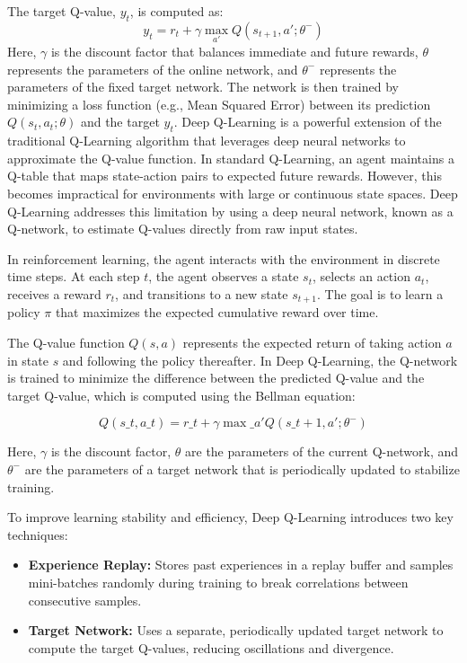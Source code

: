 \documentclass{report}
\begin{document}
The target Q-value, $y_t$, is computed as:
\begin{equation}
y_t = r_t + \gamma \max_{a'} Q(s_{t+1}, a'; \theta^-)
\end{equation}
Here, $\gamma$ is the discount factor that balances immediate and future rewards, $\theta$ represents the parameters of the online network, and $\theta^-$ represents the parameters of the fixed target network. The network is then trained by minimizing a loss function (e.g., Mean Squared Error) between its prediction $Q(s_t, a_t; \theta)$ and the target $y_t$.
 Deep Q-Learning is a powerful extension of the traditional Q-Learning algorithm that leverages deep neural networks to approximate the Q-value function. In standard Q-Learning, an agent maintains a Q-table that maps state-action pairs to expected future rewards. However, this becomes impractical for environments with large or continuous state spaces. Deep Q-Learning addresses this limitation by using a deep neural network, known as a Q-network, to estimate Q-values directly from raw input states.

In reinforcement learning, the agent interacts with the environment in discrete time steps. At each step $t$, the agent observes a state $s_t$, selects an action $a_t$, receives a reward $r_t$, and transitions to a new state $s_{t+1}$. The goal is to learn a policy $\pi$ that maximizes the expected cumulative reward over time.

The Q-value function $Q(s, a)$ represents the expected return of taking action $a$ in state $s$ and following the policy thereafter. In Deep Q-Learning, the Q-network is trained to minimize the difference between the predicted Q-value and the target Q-value, which is computed using the Bellman equation:

\begin{equation}
Q(s\_t, a\_t) = r\_t + \gamma \max\_{a'} Q(s\_{t+1}, a'; \theta^-)
\end{equation}

Here, $\gamma$ is the discount factor, $\theta$ are the parameters of the current Q-network, and $\theta^-$ are the parameters of a target network that is periodically updated to stabilize training.

To improve learning stability and efficiency, Deep Q-Learning introduces two key techniques:
\begin{itemize}
\item \textbf{Experience Replay:} Stores past experiences in a replay buffer and samples mini-batches randomly during training to break correlations between consecutive samples.
\item \textbf{Target Network:} Uses a separate, periodically updated target network to compute the target Q-values, reducing oscillations and divergence.
\end{itemize}
\end{document}
